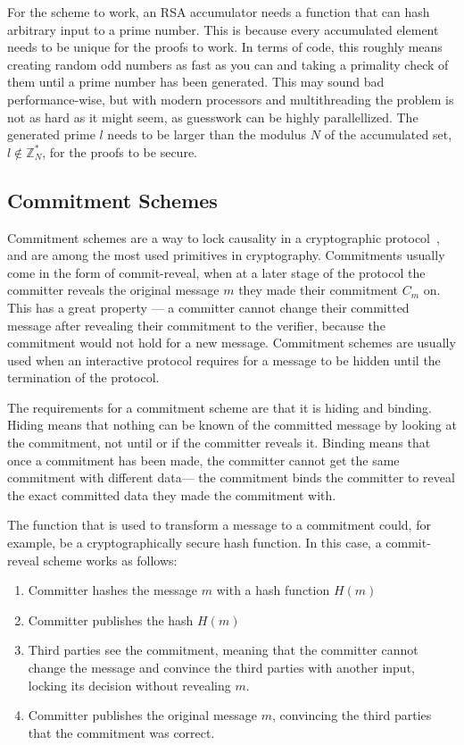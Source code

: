 For the scheme to work, an RSA accumulator needs a function that can hash arbitrary input to a prime number. This is because every accumulated element needs to be unique for the proofs to work. In terms of code, this roughly means creating random odd numbers as fast as you can and taking a primality check of them until a prime number has been generated. This may sound bad performance-wise, but with modern processors and multithreading the problem is not as hard as it might seem, as guesswork can be highly parallellized. The generated prime \(l\) needs to be larger than the modulus \(N\) of the accumulated set, \(l \notin \mathbb{Z}^*_N\), for the proofs to be secure.

\subsection{Commitment Schemes}
Commitment schemes are a way to lock causality in a cryptographic protocol~\cite{Damgard1998-vs}, and are among the most used primitives in cryptography. Commitments usually come in the form of commit-reveal, when at a later stage of the protocol the committer reveals the original message \(m\) they made their commitment \(C_m\) on. This has a great property --- a committer cannot change their committed message after revealing their commitment to the verifier, because the commitment would not hold for a new message. Commitment schemes are usually used when an interactive protocol requires for a message to be hidden until the termination of the protocol.

The requirements for a commitment scheme are that it is hiding and binding. Hiding means that nothing can be known of the committed message by looking at the commitment, not until or if the committer reveals it. Binding means that once a commitment has been made, the committer cannot get the same commitment with different data--- the commitment binds the committer to reveal the exact committed data they made the commitment with.

The function that is used to transform a message to a commitment could, for example, be a cryptographically secure hash function. In this case, a commit-reveal scheme works as follows:

\begin{enumerate}
  \item Committer hashes the message \(m\) with a hash function \(H(m)\)
  \item Committer publishes the hash \(H(m)\)
  \item Third parties see the commitment, meaning that the committer cannot change the message and convince the third parties with another input, locking its decision without revealing \(m\).
  \item Committer publishes the original message \(m\), convincing the third parties that the commitment was correct.
\end{enumerate}


